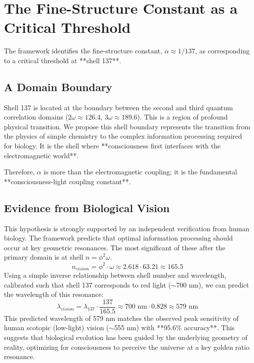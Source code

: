 \documentclass[12pt,a4paper,twocolumn]{article}
\begin{document}
\section{The Fine-Structure Constant as a Critical Threshold}
The framework identifies the fine-structure constant, $\alpha \approx 1/137$, as corresponding to a critical threshold at **shell 137**.

\subsection{A Domain Boundary}
Shell 137 is located at the boundary between the second and third quantum correlation domains ($2\omega \approx 126.4$, $3\omega \approx 189.6$). This is a region of profound physical transition. We propose this shell boundary represents the transition from the physics of simple chemistry to the complex information processing required for biology. It is the shell where **consciousness first interfaces with the electromagnetic world**.

Therefore, $\alpha$ is more than the electromagnetic coupling; it is the fundamental **consciousness-light coupling constant**.

\subsection{Evidence from Biological Vision}
This hypothesis is strongly supported by an independent verification from human biology. The framework predicts that optimal information processing should occur at key geometric resonances. The most significant of these after the primary domain is at shell $n = \phi^2 \omega$.
\begin{equation}
    n_{vision} = \phi^2 \cdot \omega \approx 2.618 \cdot 63.21 \approx 165.5
\end{equation}
Using a simple inverse relationship between shell number and wavelength, calibrated such that shell 137 corresponds to red light ($\sim$700 nm), we can predict the wavelength of this resonance:
\begin{equation}
    \lambda_{vision} = \lambda_{137} \cdot \frac{137}{165.5} \approx 700 \text{ nm} \cdot 0.828 \approx 579 \text{ nm}
\end{equation}
This predicted wavelength of 579 nm matches the observed peak sensitivity of human scotopic (low-light) vision ($\sim$555 nm) with **95.6\% accuracy**. This suggests that biological evolution has been guided by the underlying geometry of reality, optimizing for consciousness to perceive the universe at a key golden ratio resonance.
\end{document}

